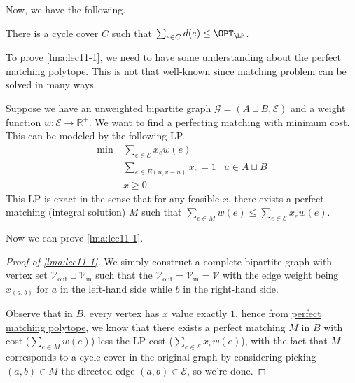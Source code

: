Now, we have the following.

\begin{lemma}\label{lma:lec11-1}
	There is a cycle cover \(C\) such that \(\sum_{e\in C} d(e) \leq \OPT_{\LP }\).
\end{lemma}

To prove \autoref{lma:lec11-1}, we need to have some understanding about the \hyperref[rmk:perfect-matching-polytope]{perfect matching polytope}. This is not that well-known since matching problem can be solved in many ways.

\begin{remark}\label{rmk:perfect-matching-polytope}
	Suppose we have an unweighted bipartite graph \(\mathcal{G} =(A \sqcup B, \mathcal{E} )\) and a weight function \(w\colon \mathcal{E} \to \mathbb{R} ^+\). We want to find a perfecting matching with minimum cost. This can be modeled by the following LP.
	\[
		\begin{aligned}
			\min~ & \sum_{e\in \mathcal{E} } x_e w(e)                  \\
			      & \sum_{e\in E(u, v-u)} x_e = 1     & u\in A\sqcup B \\
			      & x\geq 0.
		\end{aligned}
	\]
	This LP is exact in the sense that for any feasible \(x\), there exists a perfect matching (integral solution) \(M\) such that \(\sum_{e\in M} w(e) \leq \sum_{e\in \mathcal{E}} x_e w(e)\).
\end{remark}

\vspace*{1em}
Now we can prove \autoref{lma:lec11-1}.
\begin{proof}[Proof of \autoref{lma:lec11-1}]
	We simply construct a complete bipartite graph with vertex set \(\mathcal{V}_{\text{out}} \sqcup \mathcal{V}_{\text{in} }\) such that the \(\mathcal{V} _{\text{out} }= \mathcal{V} _{\text{in} }= \mathcal{V} \) with the edge weight being \(x_{(a, b)}\) for \(a\) in the left-hand side while \(b\) in the right-hand side.

	Observe that in \(B\), every vertex has \(x\) value exactly \(1\), hence from \hyperref[rmk:perfect-matching-polytope]{perfect matching polytope}, we know that there exists a perfect matching \(M\) in \(B\) with cost (\(\sum_{e\in M} w(e)\)) less the LP cost (\(\sum_{e\in \mathcal{E} } x_e w(e)\)), with the fact that \(M\) corresponds to a cycle cover in the original graph by considering picking \((a, b)\in M\) the directed edge \((a, b)\in \mathcal{E} \),  so we're done.
\end{proof}

